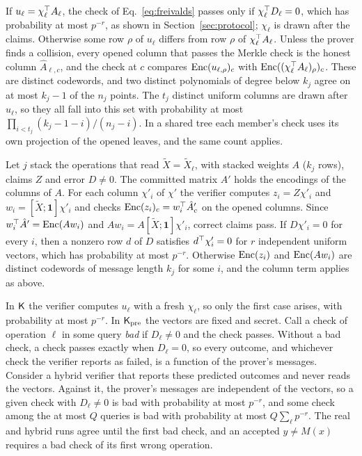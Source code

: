  If $u_\ell=\chi_\ell^\top A_\ell$, the check of Eq.~\eqref{eq:freivalds} passes only
if $\chi_\ell^\top D_\ell=0$, which has probability at most $p^{-r}$, as shown in
Section~\ref{sec:protocol}; $\chi_\ell$ is drawn after the claims. Otherwise some row $\rho$ of
$u_\ell$ differs from row $\rho$ of $\chi_\ell^\top A_\ell$. Unless the prover finds a collision, every
opened column that passes the Merkle check is the honest column $\hat A_{\ell,c}$, and the check at
$c$ compares $\mathrm{Enc}(u_{\ell,\rho})_c$ with $\mathrm{Enc}((\chi_\ell^\top A_\ell)_\rho)_c$. These are distinct
codewords, and two distinct polynomials of degree below $k_j$ agree on at most $k_j-1$ of the $n_j$
points. The $t_j$ distinct uniform columns are drawn after $u_\ell$, so they all fall into this set
with probability at most $\prod_{i<t_j}(k_j-1-i)/(n_j-i)$. In a shared tree each member's check uses
its own projection of the opened leaves, and the same count applies.

 Let $j$ stack the operations that read $\tilde X=\tilde X_\ell$, with stacked
weights $A$ ($k_j$ rows), claims $Z$ and error $D\neq0$. The committed matrix $\hat A'$ holds the
encodings of the columns of $A$. For each column $\chi'_i$ of $\chi'$ the verifier computes
$z_i=Z\chi'_i$ and $w_i=[\tilde X;\mathbf 1]\chi'_i$ and checks $\mathrm{Enc}(z_i)_c=w_i^\top\hat A'_{c}$ on the
opened columns. Since $w_i^\top\hat A'=\mathrm{Enc}(Aw_i)$ and $Aw_i=A[\tilde X;\mathbf 1]\chi'_i$, correct claims
pass. If $D\chi'_i=0$ for every $i$, then a nonzero row $d$ of $D$ satisfies $d^\top\chi'_i=0$ for $r$ independent uniform vectors, which has probability at most
$p^{-r}$. Otherwise $\mathrm{Enc}(z_i)$ and $\mathrm{Enc}(Aw_i)$ are distinct codewords of message length $k_j$ for
some $i$, and the column term applies as above.

 In $\mathsf{K}$ the verifier computes $u_\ell$ with a fresh $\chi_\ell$, so
only the first case arises, with probability at most $p^{-r}$. In $\mathsf{K}_{\mathrm{pre}}$ the vectors are fixed and
secret. Call a check of operation $\ell$ in some query \emph{bad} if $D_\ell\neq0$ and the check
passes. Without a bad check, a check passes exactly when $D_\ell=0$, so every outcome, and whichever
check the verifier reports as failed, is a function of the prover's messages. Consider a hybrid
verifier that reports these predicted outcomes and never reads the vectors. Against it, the
prover's messages are independent of the vectors, so a given check with $D_\ell\neq0$ is bad with
probability at most $p^{-r}$, and some check among the at most $Q$ queries is bad with probability
at most $Q\sum_\ell p^{-r}$. The real and hybrid runs agree until the first bad check, and an
accepted $y\neq M(x)$ requires a bad check of its first wrong operation.

